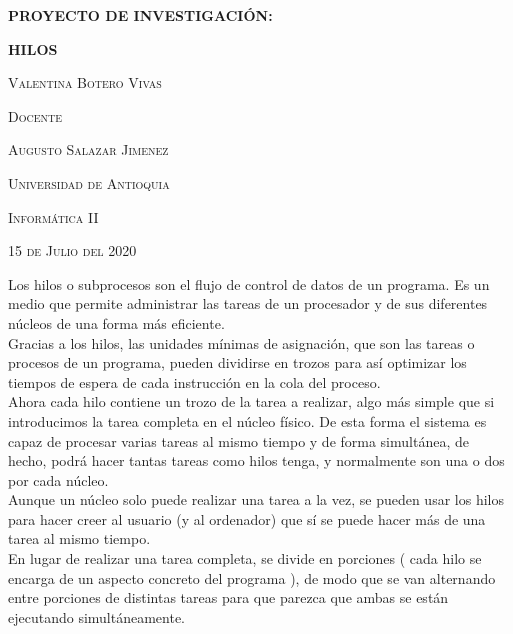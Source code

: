 \documentclass{report}   %
\begin{document}
\begin{titlepage}    %
	\centering
	{\huge\bfseries PROYECTO DE INVESTIGACIÓN: \par}
	\vspace{1cm}
	{\huge\bfseries HILOS \par}
    \vspace{3cm}
    {\scshape\large Valentina Botero Vivas \par}
    \vspace{3cm}
      {\scshape\large Docente  \par}
	\vspace{0.5cm}
    {\scshape\large Augusto Salazar Jimenez  \par}
	\vspace{3cm}
	 {\scshape\large Universidad de Antioquia \par}
	\vspace{1cm}
    {\scshape\large Informática II  \par}
	\vspace{1cm}
	{\scshape\large 15 de Julio del 2020 \par}
\end{titlepage}
Los hilos o subprocesos son  el flujo de control de datos de un programa. Es un medio que permite administrar las tareas de un procesador y de sus diferentes núcleos de una forma más eficiente.\\ Gracias a los hilos, las unidades mínimas de asignación, que son las tareas o procesos de un programa, pueden dividirse en trozos para así optimizar los tiempos de espera de cada instrucción en la cola del proceso.\\

Ahora cada hilo contiene un trozo de la tarea a realizar, algo más simple  que si introducimos la tarea completa en el núcleo físico. De esta forma el sistema es capaz de procesar varias tareas al mismo tiempo y de forma simultánea, de hecho, podrá hacer tantas tareas como hilos tenga, y normalmente son una o dos por cada núcleo.\\
Aunque un núcleo solo puede realizar una tarea a la vez, se pueden usar los hilos para hacer creer al usuario (y al ordenador) que sí se puede hacer más de una tarea al mismo tiempo.\\
En lugar de realizar una tarea completa, se divide en porciones ( cada hilo se encarga de un aspecto concreto del programa ), de modo que se van alternando entre porciones de distintas tareas para que parezca que ambas se están ejecutando simultáneamente.
\end{document}
